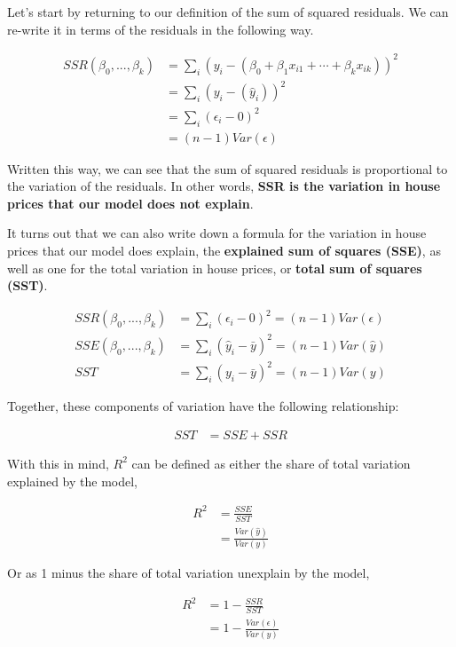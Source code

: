 \documentclass[10pt]{article}\usepackage[]{graphicx}\usepackage[]{color}
\begin{document}
Let's start by returning to our definition of the sum of squared residuals. We can re-write it in terms of the residuals in the following way.

\begin{align}
SSR(\beta_0,...,\beta_k) &= \sum_i ( y_i -  (\beta_0 + \beta_1 x_{i1} + \cdots + \beta_k x_{ik} ) )^2 \\
 &= \sum_i ( y_i -  (\hat{y}_i ) )^2 \\
 &= \sum_i  ( \epsilon_i - 0  )^2 \\
 &= (n-1) Var(\epsilon) 
\end{align}

Written this way, we can see that the sum of squared residuals is proportional to the variation of the residuals. In other words, {\bf SSR is the variation in house prices that our model does not explain}. 

It turns out that we can also write down a formula for the variation in house prices that our model does explain, the { \bf{explained sum of squares (SSE)}}, as well as one for the total variation in house prices, or {\bf{total sum of squares (SST)}}. 

\begin{align}
SSR(\beta_0,...,\beta_k) &= \sum_i  ( \epsilon_i - 0  )^2 = (n-1) Var(\epsilon) \\
SSE(\beta_0,...,\beta_k) &= \sum_i  ( \hat{y}_i - \bar{y} )^2 = (n-1) Var(\hat{y}) \\
SST &= \sum_i  ( y_i - \bar{y} )^2 = (n-1) Var(y) 
\end{align}

Together, these components of variation have the following relationship:

\begin{align}
SST &= SSE + SSR
\end{align}

With this in mind, $R^2$ can be defined as either the share of total variation explained by the model,

\begin{align}
R^2 &= \frac{SSE}{SST} \\
&= \frac{Var(\hat{y})}{Var(y)} 
\end{align}

Or as 1 minus the share of total variation unexplain by the model,

\begin{align}
R^2 &= 1 - \frac{SSR}{SST} \\
&= 1 -\frac{Var(\epsilon)}{Var(y)} 
\end{align}
\end{document}
